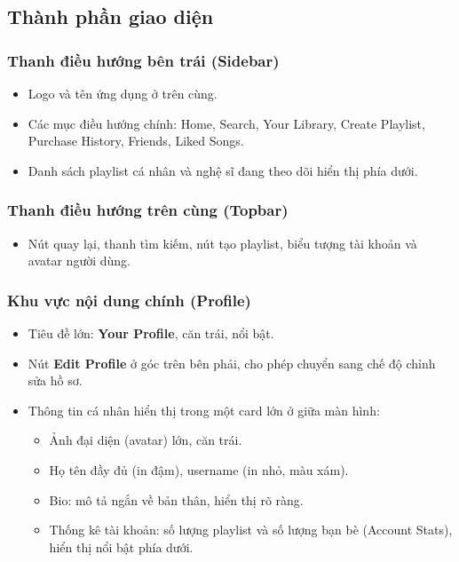 \documentclass{book}
\begin{document}
\subsection{Thành phần giao diện}

\subsubsection{Thanh điều hướng bên trái (Sidebar)}
\begin{itemize}
    \item Logo và tên ứng dụng ở trên cùng.
    \item Các mục điều hướng chính: Home, Search, Your Library, Create Playlist, Purchase History, Friends, Liked Songs.
    \item Danh sách playlist cá nhân và nghệ sĩ đang theo dõi hiển thị phía dưới.
\end{itemize}

\subsubsection{Thanh điều hướng trên cùng (Topbar)}
\begin{itemize}
    \item Nút quay lại, thanh tìm kiếm, nút tạo playlist, biểu tượng tài khoản và avatar người dùng.
\end{itemize}

\subsubsection{Khu vực nội dung chính (Profile)}
\begin{itemize}
    \item Tiêu đề lớn: \textbf{Your Profile}, căn trái, nổi bật.
    \item Nút \textbf{Edit Profile} ở góc trên bên phải, cho phép chuyển sang chế độ chỉnh sửa hồ sơ.
    \item Thông tin cá nhân hiển thị trong một card lớn ở giữa màn hình:
    \begin{itemize}
        \item Ảnh đại diện (avatar) lớn, căn trái.
        \item Họ tên đầy đủ (in đậm), username (in nhỏ, màu xám).
        \item Bio: mô tả ngắn về bản thân, hiển thị rõ ràng.
        \item Thống kê tài khoản: số lượng playlist và số lượng bạn bè (Account Stats), hiển thị nổi bật phía dưới.
    \end{itemize}
\end{itemize}
\end{document}
